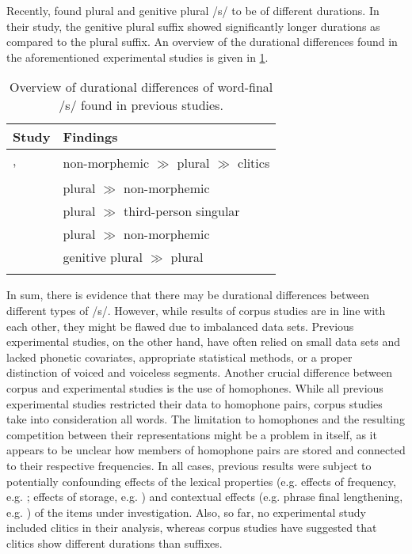 Recently, \citet{Plag2020} found plural and genitive plural /s/ to be of different durations. In their study, the genitive plural suffix showed significantly longer durations as compared to the plural suffix. An overview of the durational differences found in the aforementioned experimental studies is given in \ref{tab:2.1}.

\begin{table}\fontsize{10}{11}
\caption{Overview of durational differences of word-final /s/ found in previous studies.}
\label{tab:2.1}
\begin{tabular}{ll}
\lsptoprule
Study                                & Findings                                         \\
\midrule
\cite{Zimmermann2016, Plag2017}, & \multirow{2}{*}{non-morphemic $\gg$
plural $\gg$ clitics}  \\
\cite{Tomaschek2019}               &                                                  \\
\cite{Walsh1983}                  & plural $\gg$ non-morphemic                            \\
\cite{Hsieh1999}                   & plural $\gg$ third-person singular                    \\
\cite{Seyfarth2017}                & plural $\gg$ non-morphemic                            \\
\cite{Plag2020}                    & genitive plural $\gg$ plural                 \\
\lspbottomrule
\end{tabular}
\end{table}

In sum, there is evidence that there may be durational differences between different types of /s/. However, while results of corpus studies are in line with each other, they might be flawed due to imbalanced data sets. Previous experimental studies, on the other hand, have often relied on small data sets and lacked phonetic covariates, appropriate statistical methods, or a proper distinction of voiced and voiceless segments. Another crucial difference between corpus and experimental studies is the use of homophones. While all previous experimental studies restricted their data to homophone pairs, corpus studies take into consideration all words. The limitation to homophones and the resulting competition between their representations might be a problem in itself, as it appears to be unclear how members of homophone pairs are stored and connected to their respective frequencies. In all cases, previous results were subject to potentially confounding effects of the lexical properties (e.g. effects of frequency, e.g. \cite{Gahl2008,Lohmann2018}; effects of storage, e.g. \cite{Caselli2016}) and contextual effects (e.g. phrase final lengthening, e.g. \cite{Klatt1976,Wightman1992}) of the items under investigation. Also, so far, no experimental study included clitics in their analysis, whereas corpus studies have suggested that clitics show different durations than suffixes.

